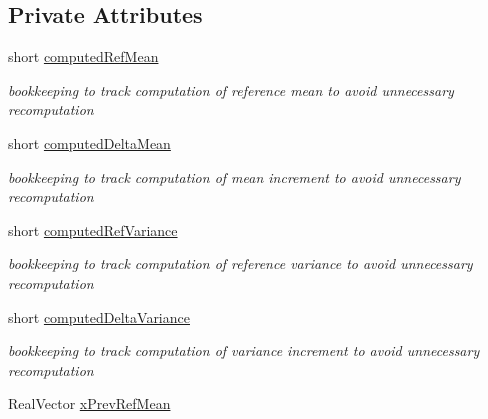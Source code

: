 \subsection*{Private Attributes}
\begin{DoxyCompactItemize}
\item 
short \hyperlink{classPecos_1_1HierarchInterpPolyApproximation_a05274c85108646d0aa803e46b8f379a4}{computed\+Ref\+Mean}\label{classPecos_1_1HierarchInterpPolyApproximation_a05274c85108646d0aa803e46b8f379a4}

\begin{DoxyCompactList}\small\item\em bookkeeping to track computation of reference mean to avoid unnecessary recomputation \end{DoxyCompactList}\item 
short \hyperlink{classPecos_1_1HierarchInterpPolyApproximation_a0e72e83cbd24b925e31d8b8d50ff3e56}{computed\+Delta\+Mean}\label{classPecos_1_1HierarchInterpPolyApproximation_a0e72e83cbd24b925e31d8b8d50ff3e56}

\begin{DoxyCompactList}\small\item\em bookkeeping to track computation of mean increment to avoid unnecessary recomputation \end{DoxyCompactList}\item 
short \hyperlink{classPecos_1_1HierarchInterpPolyApproximation_abdc437fc94e9e7c66ec7f16b1c322de8}{computed\+Ref\+Variance}\label{classPecos_1_1HierarchInterpPolyApproximation_abdc437fc94e9e7c66ec7f16b1c322de8}

\begin{DoxyCompactList}\small\item\em bookkeeping to track computation of reference variance to avoid unnecessary recomputation \end{DoxyCompactList}\item 
short \hyperlink{classPecos_1_1HierarchInterpPolyApproximation_ad37f24bebad7a2c76f85bb1e0246cab8}{computed\+Delta\+Variance}\label{classPecos_1_1HierarchInterpPolyApproximation_ad37f24bebad7a2c76f85bb1e0246cab8}

\begin{DoxyCompactList}\small\item\em bookkeeping to track computation of variance increment to avoid unnecessary recomputation \end{DoxyCompactList}\item 
Real\+Vector \hyperlink{classPecos_1_1HierarchInterpPolyApproximation_a15c0d1a4a6790857b13bd70ebb66eac5}{x\+Prev\+Ref\+Mean}\label{classPecos_1_1HierarchInterpPolyApproximation_a15c0d1a4a6790857b13bd70ebb66eac5}


\end{DoxyCompactItemize}
